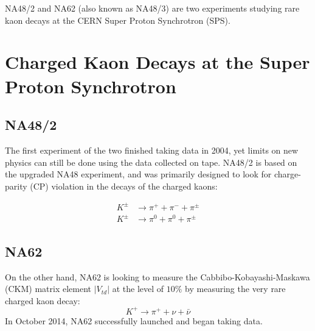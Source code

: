 NA48/2 \cite{Batley:1999fv} and NA62 \cite{Martellotti:2015kna} (also known as NA48/3) are two experiments studying rare kaon decays at the CERN Super Proton Synchrotron (SPS).
\section{Charged Kaon Decays at the Super Proton Synchrotron}

\subsection{NA48/2}
The first experiment of the two finished taking data in 2004, yet limits on new physics can still be done using the data collected on tape.
NA48/2 is based on the upgraded NA48 experiment, and was primarily designed to look for charge-parity (CP) violation in the decays of the charged kaons:

\begin{align}
K^\pm & \rightarrow \pi^+ + \pi^- + \pi^\pm \\
K^\pm & \rightarrow \pi^0 + \pi^0 + \pi^\pm
\end{align}

\subsection{NA62}
On the other hand, NA62 is looking to measure the Cabbibo-Kobayashi-Maskawa (CKM) matrix element $|V_{td}|$ at the level of $10\%$ by measuring the very rare charged kaon decay:
\begin{equation}
K^+ \rightarrow \pi^+ + \nu + \bar{\nu}
\end{equation}
In October 2014, NA62 successfully launched and began taking data.
